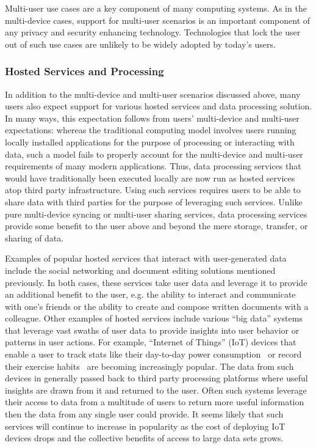 Multi-user use cases are a key component of many computing systems. As
in the multi-device cases, support for multi-user scenarios is an
important component of any privacy and security enhancing
technology. Technologies that lock the user out of such use cases are
unlikely to be widely adopted by today's users.

\subsubsection{Hosted Services and Processing}

In addition to the multi-device and multi-user scenarios discussed
above, many users also expect support for various hosted services and
data processing solution. In many ways, this expectation follows from
users' multi-device and multi-user expectations: whereas the
traditional computing model involves users running locally installed
applications for the purpose of processing or interacting with data,
such a model fails to properly account for the multi-device and
multi-user requirements of many modern applications. Thus, data
processing services that would have traditionally been executed
locally are now run as hosted services atop third party
infrastructure. Using such services requires users to be able to share
data with third parties for the purpose of leveraging such
services. Unlike pure multi-device syncing or multi-user sharing
services, data processing services provide some benefit to the user
above and beyond the mere storage, transfer, or sharing of data.

Examples of popular hosted services that interact with user-generated
data include the social networking and document editing solutions
mentioned previously. In both cases, these services take user data and
leverage it to provide an additional benefit to the user, e.g. the
ability to interact and communicate with one's friends or the ability
to create and compose written documents with a colleague. Other
examples of hosted services include various ``big data'' systems that
leverage vast swaths of user data to provide insights into user
behavior or patterns in user actions. For example, ``Internet of
Things'' (IoT) devices that enable a user to track stats like their
day-to-day power consumption~\cite{neurio} or record their exercise
habits~\cite{fitbit} are becoming increasingly popular. The data from
such devices in generally passed back to third party processing
platforms where useful insights are drawn from it and returned to the
user. Often such systems leverage their access to data from a
multitude of users to return more useful information then the data
from any single user could provide. It seems likely that such services
will continue to increase in popularity as the cost of deploying IoT
devices drops and the collective benefits of access to large data sets
grows.

